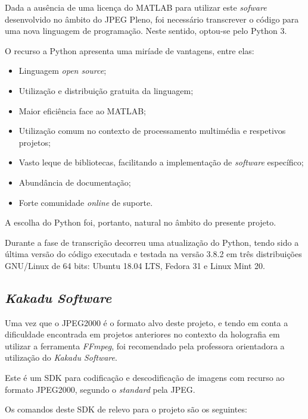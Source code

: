 Dada a ausência de uma licença do MATLAB para utilizar este \textit{sofware} desenvolvido no âmbito do JPEG Pleno, foi necessário transcrever o código para uma nova linguagem de programação. Neste sentido, optou-se pelo Python 3.


O recurso a Python apresenta uma miríade de vantagens, entre elas:
\begin{itemize}
    \item Linguagem \textit{open source};
    \item Utilização e distribuição gratuita da linguagem;
    \item Maior eficiência face ao MATLAB;
    \item Utilização comum no contexto de processamento multimédia e respetivos projetos;
    \item Vasto leque de bibliotecas, facilitando a implementação de \textit{software} específico;
    \item Abundância de documentação;
    \item Forte comunidade \textit{online} de suporte.
\end{itemize}

A escolha do Python foi, portanto, natural no âmbito do presente projeto.

Durante a fase de transcrição decorreu uma atualização do Python, tendo sido a última versão do código executada e testada na versão 3.8.2 em três distribuições GNU/Linux de 64 bits: Ubuntu 18.04 LTS, Fedora 31 e Linux Mint 20.

\subsection{\textit{Kakadu Software}}
\label{ssec::tecno-ferr:tecno-ferr:kdu}
Uma vez que o JPEG2000 é o formato alvo deste projeto, e tendo em conta a dificuldade encontrada em projetos anteriores no contexto da holografia em utilizar a ferramenta \textit{FFmpeg}, foi recomendado pela professora orientadora a utilização do \textit{Kakadu Software}.

Este é um \ac{SDK} para codificação e descodificação de imagens com recurso ao formato JPEG2000, segundo o \textit{standard} pela \ac{JPEG}.

Os comandos deste \ac{SDK} de relevo para o projeto são os seguintes:

